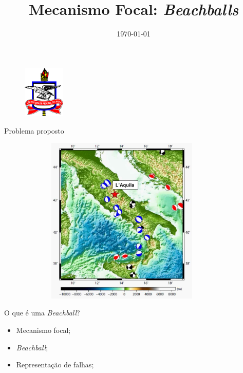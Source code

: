 \documentclass{beamer}
\title[Seminário]{Mecanismo Focal: \textit{ Beachballs}} %
\author{} %
\institute[UFPA] %
{
	Professor: Jessé Costa\\
Universidade Federal do Pará \\ %
\medskip
}
\date{\today} %
\begin{document}
 \begin{frame}
\begin{figure}[htb]
\centering
\includegraphics[width= 2cm, height= 2.5cm]{logo.jpg}
\end{figure}

\titlepage
\end{frame}

\begin{frame}{Problema proposto}
	\begin{figure}[htb]
		\centering
		\includegraphics[width= 10cm, height= 8cm]{problema_geral}
	\end{figure}
\end{frame}

\begin{frame}{O que é uma \textit{Beachball}?}
	\justifying
	\begin{itemize}
		\item Mecanismo focal;
		\item \textit{Beachball};
		\item Representação de falhas;
	\end{itemize}
\end{frame}
\end{document}
